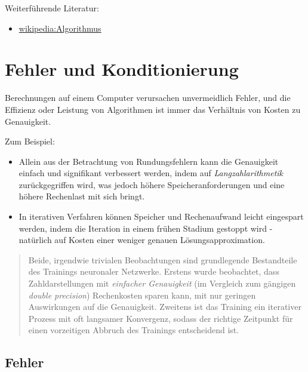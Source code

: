 \documentclass[
]{book}
\providecommand{\tightlist}{%
  \setlength{\itemsep}{0pt}\setlength{\parskip}{0pt}}
\newenvironment {JHSAYS} [0] {\begin{quote}\color{jhsc}} {\end{quote}}
\theoremstyle{definition}
\theoremstyle{definition}
\theoremstyle{definition}
\theoremstyle{definition}
\theoremstyle{remark}
\begin{document}
Weiterführende Literatur:

\begin{itemize}
\tightlist
\item
  \href{https://de.wikipedia.org/wiki/Algorithmus\#Definition}{wikipedia:Algorithmus}
\end{itemize}

\hypertarget{fehler-und-konditionierung}{%
\chapter{Fehler und Konditionierung}\label{fehler-und-konditionierung}}

\def\kij{(\kappa_{A,x})_{ij}}

Berechnungen auf einem Computer verursachen unvermeidlich Fehler, und die Effizienz oder Leistung von Algorithmen ist immer das Verhältnis von Kosten zu Genauigkeit.

Zum Beispiel:

\begin{itemize}
\item
  Allein aus der Betrachtung von Rundungsfehlern kann die Genauigkeit einfach und signifikant verbessert werden, indem auf \emph{Langzahlarithmetik} zurückgegriffen wird, was jedoch höhere Speicheranforderungen und eine höhere Rechenlast mit sich bringt.
\item
  In iterativen Verfahren können Speicher und Rechenaufwand leicht eingespart werden, indem die Iteration in einem frühen Stadium gestoppt wird - natürlich auf Kosten einer weniger genauen Lösungsapproximation.
\end{itemize}

\leavevmode{}%
\begin{JHSAYS}
Beide, irgendwie trivialen Beobachtungen sind grundlegende Bestandteile des Trainings neuronaler Netzwerke. Erstens wurde beobachtet, dass Zahldarstellungen mit \emph{einfacher Genauigkeit} (im Vergleich zum gängigen \emph{double precision}) Rechenkosten sparen kann, mit nur geringen Auswirkungen auf die Genauigkeit. Zweitens ist das Training ein iterativer Prozess mit oft langsamer Konvergenz, sodass der richtige Zeitpunkt für einen vorzeitigen Abbruch des Trainings entscheidend ist.

\end{JHSAYS}

\hypertarget{fehler}{%
\section{Fehler}\label{fehler}}
\end{document}
